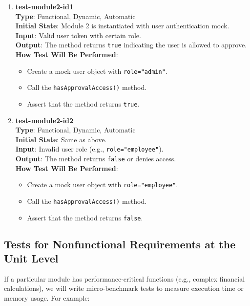 \documentclass[12pt, titlepage]{article}
\begin{document}
\begin{enumerate}
    \item \textbf{test-module2-id1} \\
        \textbf{Type}: Functional, Dynamic, Automatic \\
        \textbf{Initial State}: Module 2 is instantiated with user authentication mock. \\
        \textbf{Input}: Valid user token with certain role. \\
        \textbf{Output}: The method returns \texttt{true} indicating the user is allowed to approve. \\
        \textbf{How Test Will Be Performed}:
        \begin{itemize}
            \item Create a mock user object with \texttt{role="admin"}.
            \item Call the \texttt{hasApprovalAccess()} method.
            \item Assert that the method returns \texttt{true}.
        \end{itemize}
    \item \textbf{test-module2-id2} \\
        \textbf{Type}: Functional, Dynamic, Automatic \\
        \textbf{Initial State}: Same as above. \\
        \textbf{Input}: Invalid user role (e.g., \texttt{role="employee"}). \\
        \textbf{Output}: The method returns \texttt{false} or denies access. \\
        \textbf{How Test Will Be Performed}:
        \begin{itemize}
            \item Create a mock user object with \texttt{role="employee"}.
            \item Call the \texttt{hasApprovalAccess()} method.
            \item Assert that the method returns \texttt{false}.
        \end{itemize}
\end{enumerate}

\subsection{Tests for Nonfunctional Requirements at the Unit Level}
If a particular module has performance-critical functions (e.g., complex financial calculations), we will write micro-benchmark tests to measure execution time or memory usage. For example:
\end{document}

